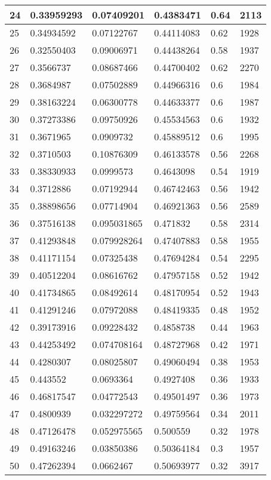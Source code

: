 \begin{longtable}{|l|l|l|l|l|l|}
24 & 0.33959293 & 0.07409201 & 0.4383471 & 0.64 & 2113 \\ \hline 
25 & 0.34934592 & 0.07122767 & 0.44114083 & 0.62 & 1928 \\ \hline 
26 & 0.32550403 & 0.09006971 & 0.44438264 & 0.58 & 1937 \\ \hline 
27 & 0.3566737 & 0.08687466 & 0.44700402 & 0.62 & 2270 \\ \hline 
28 & 0.3684987 & 0.07502889 & 0.44966316 & 0.6 & 1984 \\ \hline 
29 & 0.38163224 & 0.06300778 & 0.44633377 & 0.6 & 1987 \\ \hline 
30 & 0.37273386 & 0.09750926 & 0.45534563 & 0.6 & 1932 \\ \hline 
31 & 0.3671965 & 0.0909732 & 0.45889512 & 0.6 & 1995 \\ \hline 
32 & 0.3710503 & 0.10876309 & 0.46133578 & 0.56 & 2268 \\ \hline 
33 & 0.38330933 & 0.0999573 & 0.4643098 & 0.54 & 1919 \\ \hline 
34 & 0.3712886 & 0.07192944 & 0.46742463 & 0.56 & 1942 \\ \hline 
35 & 0.38898656 & 0.07714904 & 0.46921363 & 0.56 & 2589 \\ \hline 
36 & 0.37516138 & 0.095031865 & 0.471832 & 0.58 & 2314 \\ \hline 
37 & 0.41293848 & 0.079928264 & 0.47407883 & 0.58 & 1955 \\ \hline 
38 & 0.41171154 & 0.07325438 & 0.47694284 & 0.54 & 2295 \\ \hline 
39 & 0.40512204 & 0.08616762 & 0.47957158 & 0.52 & 1942 \\ \hline 
40 & 0.41734865 & 0.08492614 & 0.48170954 & 0.52 & 1943 \\ \hline 
41 & 0.41291246 & 0.07972088 & 0.48419335 & 0.48 & 1952 \\ \hline 
42 & 0.39173916 & 0.09228432 & 0.4858738 & 0.44 & 1963 \\ \hline 
43 & 0.44253492 & 0.074708164 & 0.48727968 & 0.42 & 1971 \\ \hline 
44 & 0.4280307 & 0.08025807 & 0.49060494 & 0.38 & 1953 \\ \hline 
45 & 0.443552 & 0.0693364 & 0.4927408 & 0.36 & 1933 \\ \hline 
46 & 0.46817547 & 0.04772543 & 0.49501497 & 0.36 & 1973 \\ \hline 
47 & 0.4800939 & 0.032297272 & 0.49759564 & 0.34 & 2011 \\ \hline 
48 & 0.47126478 & 0.052975565 & 0.500559 & 0.32 & 1978 \\ \hline 
49 & 0.49163246 & 0.03850386 & 0.50364184 & 0.3 & 1957 \\ \hline 
50 & 0.47262394 & 0.0662467 & 0.50693977 & 0.32 & 3917 \\ \hline 
\end{longtable}